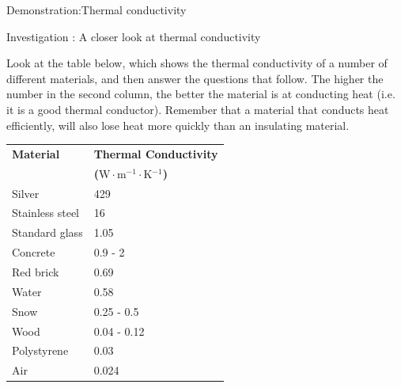 \begin{gexperiment}{Demonstration:Thermal conductivity}
	\par
\label{m38706*secfhsst!!!underscore!!!id492}
            \begin{gexperiment}{Investigation : A closer look at thermal conductivity}
{            \nopagebreak
      \label{m38706*id66744}Look at the table below, which shows the thermal conductivity of a number of different materials, and then answer the questions that follow. The higher the number in the second column, the better the material is at conducting heat (i.e. it is a good thermal conductor). Remember that a material that conducts heat efficiently, will also lose heat more quickly than an insulating material.\par 
          \begin{table}[H]
        \begin{center}
      \label{m38706*id66753}
    \noindent
      \begin{tabular}{|l|l|}\hline
\textbf{Material} & \textbf{Thermal Conductivity} \\ 
                 &  \textbf{($\mathrm{W}\ensuremath{\cdot}\mathrm{m}{}^{-1}\ensuremath{\cdot}\mathrm{K}{}^{-1}$) } \\ \hline
Silver & 429 \\ \hline
Stainless steel & 16 \\ \hline
Standard glass & 1.05 \\ \hline
Concrete & 0.9 - 2 \\ \hline
Red brick & 0.69 \\ \hline
Water & 0.58 \\ \hline
Snow & 0.25 - 0.5 \\ \hline
Wood & 0.04 - 0.12 \\ \hline
Polystyrene & 0.03 \\ \hline
Air & 0.024 \\ \hline
    \end{tabular}
      \end{center}

\end{table}}
\end{gexperiment}
\end{gexperiment}

